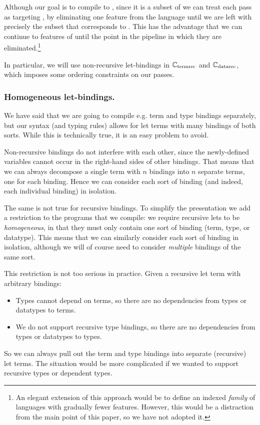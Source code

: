 Although our goal is to compile to \FOMF{}, since it is a subset of \FIR{} we
can treat each pass as targeting \FIR{}, by eliminating one feature from the language
until we are left with precisely the subset that corresponds to \FOMF{}. This
has the advantage that we can continue to features of \FIR{} until the point in the
pipeline in which they are eliminated.\footnote{An elegant extension of this
  approach would be to define an indexed \emph{family} of languages with
  gradually fewer features. However, this would be a distraction from the main
  point of this paper, so we have not adopted it.}

In particular, we will use non-recursive let-bindings in $\mathbb{C}_{\mathrm{termrec}}$ and
$\mathbb{C}_{\mathrm{datarec}}$, which imposes some ordering constraints on our passes.

\subsubsection{Homogeneous let-bindings.}

We have said that we are going to compile e.g. term and type bindings
separately, but our syntax (and typing rules) allows for let terms with many
bindings of both sorts. While this is technically true, it is an easy problem to avoid.

Non-recursive bindings do not interfere with each other, since the
newly-defined variables cannot occur in the right-hand sides of other bindings.
That means that we can always decompose a single term with $n$ bindings into $n$
separate terms, one for each binding. Hence we can consider each sort of binding
(and indeed, each individual binding) in isolation.

The same is not true for recursive bindings. To simplify the presentation we
add a restriction to the programs that we compile: we require recursive
lets to be \emph{homogeneous}, in that they must only contain one sort
of binding (term, type, or datatype). This means that we can similarly consider
each sort of binding in isolation, although we will of course need to consider
\emph{multiple} bindings of the same sort.

This restriction is not too serious in practice. Given a recursive let term with
arbitrary bindings:
\begin{itemize}
  \item Types cannot depend on terms, so there are no dependencies from types or
    datatypes to terms.
  \item We do not support recursive type bindings, so there are no dependencies
    from types or datatypes to types.
\end{itemize}
So we can always pull out the term and type bindings into separate (recursive)
let terms. The situation would be more complicated if we wanted to support
recursive types or dependent types.

